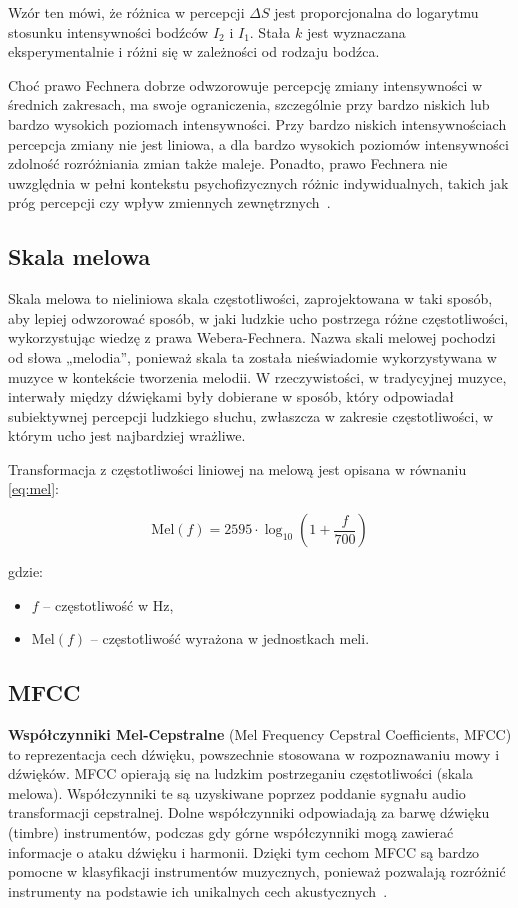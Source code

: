 \documentclass{SGGW-thesis}
\begin{document}
Wzór ten mówi, że różnica w percepcji \( \Delta S \) jest proporcjonalna do logarytmu stosunku intensywności bodźców \( I_2 \) i \( I_1 \). Stała \( k \) jest wyznaczana eksperymentalnie i różni się w zależności od rodzaju bodźca.

Choć prawo Fechnera dobrze odwzorowuje percepcję zmiany intensywności w średnich zakresach, ma swoje ograniczenia, szczególnie przy bardzo niskich lub bardzo wysokich poziomach intensywności. Przy bardzo niskich intensywnościach percepcja zmiany nie jest liniowa, a dla bardzo wysokich poziomów intensywności zdolność rozróżniania zmian także maleje. Ponadto, prawo Fechnera nie uwzględnia w pełni kontekstu psychofizycznych różnic indywidualnych, takich jak próg percepcji czy wpływ zmiennych zewnętrznych~\cite{gescheider2013psychophysics}.


\subsection{Skala melowa}

Skala melowa to nieliniowa skala częstotliwości, zaprojektowana w taki sposób, aby lepiej odwzorować sposób, w jaki ludzkie ucho postrzega różne częstotliwości, wykorzystując wiedzę z prawa Webera-Fechnera. Nazwa skali melowej pochodzi od słowa „melodia”, ponieważ skala ta została nieświadomie wykorzystywana w muzyce w kontekście tworzenia melodii. W rzeczywistości, w tradycyjnej muzyce, interwały między dźwiękami były dobierane w sposób, który odpowiadał subiektywnej percepcji ludzkiego słuchu, zwłaszcza w zakresie częstotliwości, w którym ucho jest najbardziej wrażliwe.

Transformacja z częstotliwości liniowej na melową jest opisana w równaniu \ref{eq:mel}:

\begin{equation}
\text{Mel}(f) = 2595 \cdot \log_{10} \left( 1 + \frac{f}{700} \right)
\label{eq:mel}
\end{equation}

gdzie:
\begin{itemize}
    \renewcommand{\labelitemi}{}
    \item \( f \) – częstotliwość w Hz,
    \item \( \text{Mel}(f) \) – częstotliwość wyrażona w jednostkach meli.
\end{itemize}


\subsection{MFCC}
\textbf{Współczynniki Mel-Cepstralne} (Mel Frequency Cepstral Coefficients, MFCC) to reprezentacja cech dźwięku, powszechnie stosowana w rozpoznawaniu mowy i dźwięków. MFCC opierają się na ludzkim postrzeganiu częstotliwości (skala melowa). Współczynniki te są uzyskiwane poprzez poddanie sygnału audio transformacji cepstralnej. Dolne współczynniki odpowiadają za barwę dźwięku (timbre) instrumentów, podczas gdy górne współczynniki mogą zawierać informacje o ataku dźwięku i harmonii. Dzięki tym cechom MFCC są bardzo pomocne w klasyfikacji instrumentów muzycznych, ponieważ pozwalają rozróżnić instrumenty na podstawie ich unikalnych cech akustycznych~\cite{jadhav2015classification}.
\end{document}
